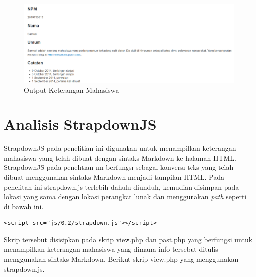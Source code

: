 \begin{figure}[pt]
\centering
\includegraphics[scale=0.45]{Gambar/overall.png}
\caption[Output Keterangan Mahasiswa]{Output Keterangan Mahasiswa} 
\label{fig:overall}
\end{figure}

\section{Analisis StrapdownJS}
\label{sec:analisisStrapdownJS}
StrapdownJS pada penelitian ini digunakan untuk menampilkan keterangan mahasiswa yang telah dibuat dengan sintaks Markdown ke halaman HTML. StrapdownJS pada penelitian ini berfungsi sebagai konversi teks yang telah dibuat menggunakan sintaks Markdown menjadi tampilan HTML. Pada penelitan ini strapdown.js terlebih dahulu diunduh, kemudian disimpan pada lokasi yang sama dengan lokasi perangkat lunak dan menggunakan {\it path} seperti di bawah ini.
\begin{lstlisting}[basicstyle=\footnotesize]
<script src="js/0.2/strapdown.js"></script>
\end{lstlisting}
Skrip tersebut disisipkan pada skrip view.php dan past.php yang berfungsi untuk menampilkan keterangan mahasiswa yang dimana info tersebut ditulis menggunakan sintaks Markdown. Berikut skrip view.php yang menggunakan strapdown.js.
